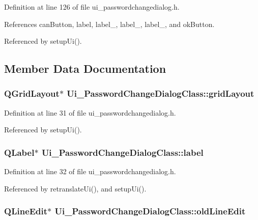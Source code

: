 Definition at line 126 of file ui\_\-passwordchangedialog.h.

References canButton, label, label\_, label\_, label\_, and okButton.

Referenced by setupUi().

\subsection{Member Data Documentation}
\hypertarget{class_ui___password_change_dialog_class_69b4119ff485b44f00df3cc875fa50da}{
\subsubsection[gridLayout]{\setlength{\rightskip}{0pt plus 5cm}QGridLayout$\ast$ {\bf Ui\_\-PasswordChangeDialogClass::gridLayout}}}
\label{class_ui___password_change_dialog_class_69b4119ff485b44f00df3cc875fa50da}




Definition at line 31 of file ui\_\-passwordchangedialog.h.

Referenced by setupUi().\hypertarget{class_ui___password_change_dialog_class_71666212d2d80702e6b969dc33c393b8}{
\subsubsection[label]{\setlength{\rightskip}{0pt plus 5cm}QLabel$\ast$ {\bf Ui\_\-PasswordChangeDialogClass::label}}}
\label{class_ui___password_change_dialog_class_71666212d2d80702e6b969dc33c393b8}




Definition at line 32 of file ui\_\-passwordchangedialog.h.

Referenced by retranslateUi(), and setupUi().\hypertarget{class_ui___password_change_dialog_class_26d6536800b17c940fd5615bd95571cc}{
\subsubsection[oldLineEdit]{\setlength{\rightskip}{0pt plus 5cm}QLineEdit$\ast$ {\bf Ui\_\-PasswordChangeDialogClass::oldLineEdit}}}
\label{class_ui___password_change_dialog_class_26d6536800b17c940fd5615bd95571cc}




